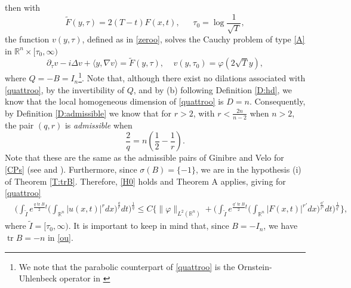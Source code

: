 \documentclass[11pt,letter]{amsart}
\def \vf{\varphi}
\newcommand{\Rn}{\mathbb R^n}
\newcommand{\p}{\partial}
\numberwithin{equation}{section}
\newcommand{\tr}{\operatorname{tr}}
\newcommand{\sa}{\langle}
\newcommand{\da}{\rangle}
\numberwithin{equation}{section}
\begin{document}
then with 
\[
\tilde F(y,\tau) = 2(T-t) F(x,t),\ \ \ \ \ \ \ \tau_0 = \log \frac 1{\sqrt T},
\]
the function $v(y,\tau)$, defined as in \eqref{zeroo}, solves the Cauchy problem of type \eqref{A} in $\Rn\times [\tau_0,\infty)$ 
\begin{equation}\label{quattroo}
\p_\tau v  - i  \Delta v + \sa y,\nabla v\da= \tilde F(y,\tau),\ \ \ \ \ v(y,\tau_0) = \vf(2\sqrt T y),
\end{equation}
where $Q = - B = I_n$\footnote{We note that the parabolic counterpart of \eqref{quattroo} is the Ornstein-Uhlenbeck operator in \cite{OU}}. 
Note that, although there exist no dilations associated with \eqref{quattroo}, by the invertibility of  $Q$, and by (b) following Definition \ref{D:hd}, we know that the local homogeneous dimension of \eqref{quattroo} is $D = n$. Consequently, by Definition \ref{D:admissible} we know that  for $r>2$, with $r < \frac{2n}{n-2}$ when $n> 2$, the pair $(q,r)$ is \emph{admissible} when
\begin{equation}\label{aqr}
\frac 2q = n(\frac 12 - \frac 1r).
\end{equation}
Note that these are the same as the admissible pairs of Ginibre and Velo for \eqref{CPs} (see \cite{GVstrich} and \cite{Caze}).
Furthermore, since $\sigma(B) = \{-1\}$, we are in the hypothesis (i) of Theorem \ref{T:trB}. Therefore, \eqref{H0} holds and Theorem A applies, giving for \eqref{quattroo}
\begin{align}\label{ou}
& \bigg(\int_{\tilde I} e^{\frac{q\tr B}2 t} \big(\int_{\Rn}|u(x,t)|^r dx\big)^{\frac qr} dt\bigg)^{\frac 1q} \le C \bigg\{\|\vf\|_{L^2(\Rn)}
 + \bigg(\int_{\tilde I} e^{\frac{q' \tr B}2 t} \big(\int_{\Rn}|F(x,t)|^{r'} dx\big)^{\frac{q'}{r'}} dt\bigg)^{\frac 1{q'}}\bigg\},
\end{align}
where $\tilde I = [\tau_0,\infty)$.
It is important to keep in mind that, since $B = - I_n$, we have $\tr B = - n$ in \eqref{ou}.
\end{document}
